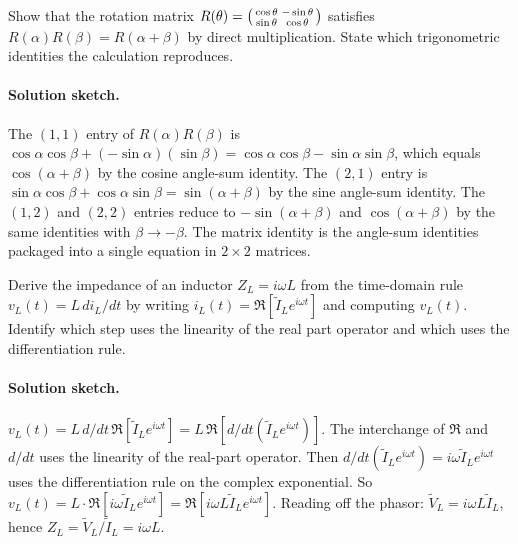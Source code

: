 \begin{exercise}
Show that the rotation matrix $R(\theta) = \begin{psmallmatrix}
\cos\theta & -\sin\theta \\ \sin\theta & \cos\theta
\end{psmallmatrix}$ satisfies $R(\alpha) R(\beta) = R(\alpha +
\beta)$ by direct multiplication. State which trigonometric
identities the calculation reproduces.

\paragraph{Solution sketch.}
The $(1, 1)$ entry of $R(\alpha) R(\beta)$ is $\cos\alpha\cos\beta
+ (-\sin\alpha)(\sin\beta) = \cos\alpha\cos\beta - \sin\alpha
\sin\beta$, which equals $\cos(\alpha + \beta)$ by the cosine
angle-sum identity. The $(2, 1)$ entry is $\sin\alpha\cos\beta +
\cos\alpha\sin\beta = \sin(\alpha + \beta)$ by the sine angle-sum
identity. The $(1, 2)$ and $(2, 2)$ entries reduce to
$-\sin(\alpha + \beta)$ and $\cos(\alpha + \beta)$ by the same
identities with $\beta \to -\beta$. The matrix identity is the
angle-sum identities packaged into a single equation in $2\times
2$ matrices.
\end{exercise}

\begin{exercise}
Derive the impedance of an inductor $Z_{L} = i\omega L$ from
the time-domain rule $v_{L}(t) = L\,di_{L}/dt$ by writing
$i_{L}(t) = \Re[\tilde{I}_{L} e^{i\omega t}]$ and computing
$v_{L}(t)$. Identify which step uses the linearity of the real
part operator and which uses the differentiation rule.

\paragraph{Solution sketch.}
$v_{L}(t) = L\,d/dt\,\Re[\tilde I_{L} e^{i\omega t}] = L\,\Re[d/dt
(\tilde I_{L} e^{i\omega t})]$. The interchange of $\Re$ and
$d/dt$ uses the linearity of the real-part operator. Then
$d/dt(\tilde I_{L} e^{i\omega t}) = i\omega \tilde I_{L} e^{i\omega
t}$ uses the differentiation rule on the complex exponential. So
$v_{L}(t) = L \cdot \Re[i\omega \tilde I_{L} e^{i\omega t}] =
\Re[i\omega L \tilde I_{L} e^{i\omega t}]$. Reading off the
phasor: $\tilde V_{L} = i\omega L \tilde I_{L}$, hence $Z_{L} =
\tilde V_{L} / \tilde I_{L} = i\omega L$.
\end{exercise}

